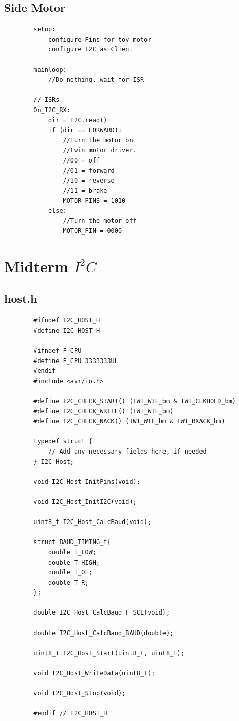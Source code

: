 \documentclass[11pt,a4paper,titlepage]{report}
\begin{document}
	\subsection{Side Motor}\label{appendix:side_motor_pseudocode}
	\begin{lstlisting}
		setup:
			configure Pins for toy motor
			configure I2C as Client
		
		mainloop:
			//Do nothing. wait for ISR
		
		// ISRs
		On_I2C_RX:
			dir = I2C.read()
			if (dir == FORWARD):
				//Turn the motor on
				//twin motor driver. 
				//00 = off
				//01 = forward
				//10 = reverse
				//11 = brake
				MOTOR_PINS = 1010
			else:
				//Turn the motor off
				MOTOR_PIN = 0000
	\end{lstlisting}
	
	\section{Midterm $I^{2}C$}\label{appendix:midterm_i2c_code}
	\subsection{host.h}\label{appendix:midterm_i2c_host_h}
	\begin{lstlisting}
		#ifndef I2C_HOST_H
		#define I2C_HOST_H
		
		#ifndef F_CPU
		#define F_CPU 3333333UL
		#endif
		#include <avr/io.h>
		
		#define I2C_CHECK_START() (TWI_WIF_bm & TWI_CLKHOLD_bm) 
		#define I2C_CHECK_WRITE() (TWI_WIF_bm)
		#define I2C_CHECK_NACK() (TWI_WIF_bm & TWI_RXACK_bm)
		
		typedef struct {
			// Add any necessary fields here, if needed
		} I2C_Host;
		
		void I2C_Host_InitPins(void);
		
		void I2C_Host_InitI2C(void);
		
		uint8_t I2C_Host_CalcBaud(void);
		
		struct BAUD_TIMING_t{
			double T_LOW;
			double T_HIGH;
			double T_OF;
			double T_R;
		};
		
		double I2C_Host_CalcBaud_F_SCL(void);
		
		double I2C_Host_CalcBaud_BAUD(double);
		
		uint8_t I2C_Host_Start(uint8_t, uint8_t);
		
		void I2C_Host_WriteData(uint8_t);
		
		void I2C_Host_Stop(void);
		
		#endif // I2C_HOST_H
	\end{lstlisting}
	
\end{document}
